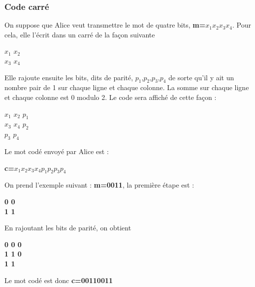 \documentclass[french,nochapter,11pt]{rapportUB}
\begin{document}
\subsubsection{Code carré}
On suppose que Alice veut transmettre le mot de quatre bits, \textbf{m=$x_1$$x_2$$x_3$$x_4$}. Pour cela, elle l'écrit dans un carré de la façon suivante \newline
\begin{tabbing}
  \hspace{5cm} $x_1$ $x_2$ \\
  \hspace{5cm} $x_3$ $x_4$
\end{tabbing}
Elle rajoute ensuite les bits, dits de parité, $p_1$,$p_2$,$p_3$,$p_4$ de sorte qu'il y ait un nombre pair de 1 sur chaque ligne et chaque colonne. \newline
La somme sur chaque ligne et chaque colonne est 0 modulo 2. \newline
Le code sera affiché de cette façon :
\begin{tabbing}
  \hspace{5cm} $x_1$ $x_2$ $p_1$ \\
  \hspace{5cm} $x_3$ $x_4$ $p_2$ \\
  \hspace{5cm} $p_3$ $p_4$
\end{tabbing}
Le mot codé envoyé par Alice est : 
\begin{tabbing}
  \hspace{5cm}\textbf{c=$x_1$$x_2$$x_3$$x_4$$p_1$$p_2$$p_3$$p_4$}
\end{tabbing}
On prend l'exemple suivant : \textbf{m=0011}, la première étape est :
\begin{tabbing}
  \hspace{5cm}\textbf{0 0} \\
  \hspace{5cm}\textbf{1 1}
\end{tabbing}
En rajoutant les bits de parité, on obtient
\begin{tabbing}
  \hspace{5cm}\textbf{0 0 0}\\
  \hspace{5cm}\textbf{1 1 0 }\\
  \hspace{5cm}\textbf{1 1}
\end{tabbing}
Le mot codé est donc \textbf{c=00110011}
\end{document}
